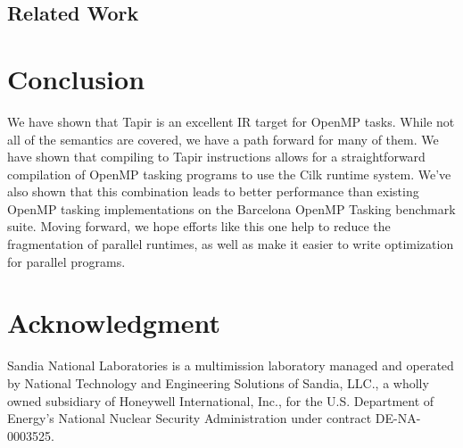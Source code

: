 \documentclass[sigconf]{acmart}
\begin{document}
\subsection{Related Work} \label{Sec:Related}

\section{Conclusion} \label{Sec:Conclusion}
We have shown that Tapir is an excellent IR target for OpenMP tasks. While not
all of the semantics are covered, we have a path forward for many of them. We have
shown that compiling to Tapir instructions allows for a straightforward compilation of 
OpenMP tasking programs to use the Cilk runtime system. We've also shown that this
combination leads to better performance than existing OpenMP tasking implementations
on the Barcelona OpenMP Tasking benchmark suite. Moving forward, we hope efforts like
this one help to reduce the fragmentation of parallel runtimes, as well as make
it easier to write optimization for parallel programs. 

\section*{Acknowledgment}
Sandia National Laboratories is a multimission laboratory managed and operated 
by National Technology and Engineering Solutions of Sandia, LLC., a wholly 
owned subsidiary of Honeywell International, Inc., for the U.S. Department of 
Energy’s National Nuclear Security Administration under contract DE-NA-0003525.



\end{document}
